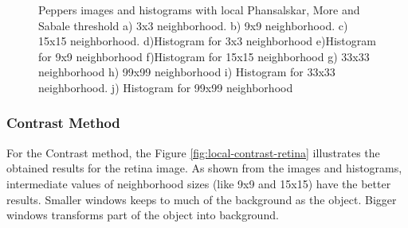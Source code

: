 \documentclass[]{IEEEtran}
\begin{document}
\begin{figure}[H]
  \caption{Peppers images and histograms with local Phansalskar, More and Sabale threshold a) 3x3 neighborhood. b) 9x9 neighborhood. c) 15x15 neighborhood. d)Histogram for 3x3 neighborhood e)Histogram for 9x9 neighborhood f)Histogram for 15x15 neighborhood g) 33x33 neighborhood h) 99x99 neighborhood i) Histogram for 33x33 neighborhood. j) Histogram for 99x99 neighborhood}
  \label{fig:local-more-peppers}
\end{figure}

\subsubsection{Contrast Method}
For the Contrast method, the Figure \ref{fig:local-contrast-retina} illustrates the obtained results for the retina image. As shown from the images and histograms, intermediate values of neighborhood sizes (like 9x9 and 15x15) have the better results. Smaller windows keeps to much of the background as the object. Bigger windows transforms part of the object into background. 
\end{document}
